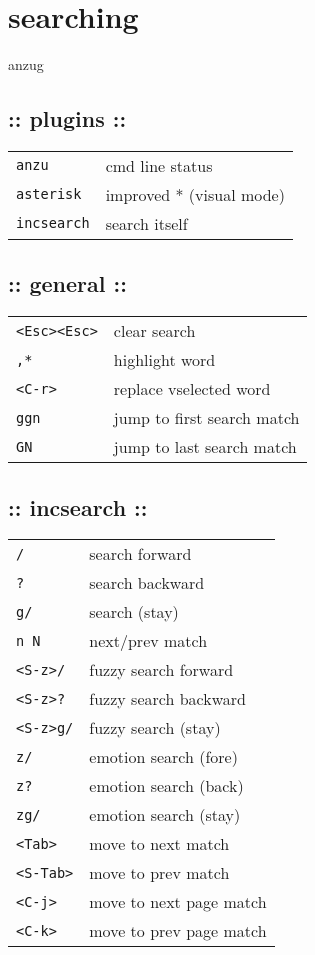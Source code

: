 \section{\hrulefill searching\hrulefill}

anzug
\subsection{:: plugins ::}
\begin{tabular}{@{}ll@{}}
    \verb!anzu!      & cmd line status \\
    \verb!asterisk!  & improved * (visual mode) \\
    \verb!incsearch! & search itself \\
\end{tabular}

\subsection{:: general ::}
\begin{tabular}{@{}ll@{}}
    \verb!<Esc><Esc>!   & clear search \\
    \verb!,*!           & highlight word \\
    \verb!<C-r>!        & replace vselected word \\
    \verb!ggn!          & jump to first search match \\
    \verb!GN!           & jump to last search match \\
\end{tabular}

\subsection{:: incsearch ::}
\begin{tabular}{@{}ll@{}}
    \verb!/!            & search forward \\
    \verb!?!            & search backward \\
    \verb!g/!           & search (stay) \\
    \verb!n N!          & next/prev match \\
    \verb!<S-z>/!       & fuzzy search forward \\
    \verb!<S-z>?!       & fuzzy search backward \\
    \verb!<S-z>g/!      & fuzzy search (stay) \\
    \verb!z/!           & emotion search (fore) \\
    \verb!z?!           & emotion search (back) \\
    \verb!zg/!          & emotion search (stay) \\
    \verb!<Tab>!        & move to next match \\
    \verb!<S-Tab>!      & move to prev match \\
    \verb!<C-j>!        & move to next page match \\
    \verb!<C-k>!        & move to prev page match \\
\end{tabular}

